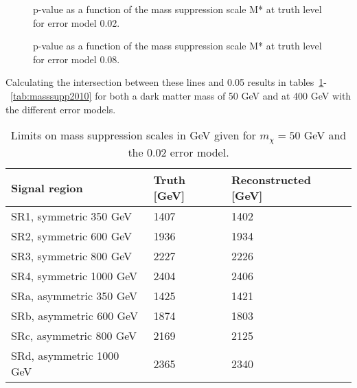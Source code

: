  \begin{figure}[H] %
    \hfill
    \caption{p-value as a function of the mass suppression scale M* at truth level for error model 0.02.}
    \label{fig:SRnewMt}
  \end{figure}
\newpage
 \begin{figure}[H] %
    \hfill
    \caption{p-value as a function of the mass suppression scale M* at truth level for error model 0.08.}
    \label{fig:SRnewMr}
  \end{figure}

Calculating the intersection between these lines and 0.05 results in tables~\ref{tab:masssupp002}-~\ref{tab:masssupp2010} for both a dark matter mass of 50 GeV and at 400 GeV with the different error models.

\begin{table}[ht]
\begin{center}
\begin{tabular}{|l|l|l|}
\hline
Signal region & Truth [GeV]& Reconstructed [GeV]\\ \hline
SR1, symmetric 350 GeV &1407&1402\\
SR2, symmetric 600 GeV&1936&1934\\
SR3, symmetric 800 GeV&2227&2226\\
SR4, symmetric 1000 GeV&2404&2406\\ \hline
SRa, asymmetric 350 GeV &1425&1421\\
SRb, asymmetric 600 GeV &1874&1803\\
SRc, asymmetric 800 GeV&2169&2125\\
SRd, asymmetric 1000 GeV&2365&2340\\ \hline
\end{tabular}
\caption{Limits on mass suppression scales in GeV given for $m_{\chi}=50$ GeV and the 0.02 error model.}
\label{tab:masssupp002}
\end{center}
\end{table}

